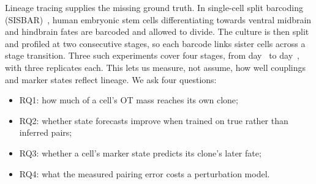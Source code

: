 \documentclass[10pt,journal,compsoc]{IEEEtran}
\begin{document}
Lineage tracing supplies the missing ground truth. In single-cell split barcoding
(SISBAR)~\cite{You_2023}, human embryonic stem cells differentiating towards ventral
midbrain and hindbrain fates are barcoded and allowed to divide. The culture is then split
and profiled at two consecutive stages, so each barcode links sister cells across a stage
transition. Three such experiments cover four stages, from day~\dayOne{} to
day~\dayFour{}, with three replicates each. This lets us measure, not assume, how well
couplings and marker states reflect lineage. We ask four questions:
\begin{itemize}
\item RQ1: how much of a cell's OT mass reaches its own clone;
\item RQ2: whether state forecasts improve when trained on true rather than inferred pairs;
\item RQ3: whether a cell's marker state predicts its clone's later fate;
\item RQ4: what the measured pairing error costs a perturbation model.
\end{itemize}
\end{document}
